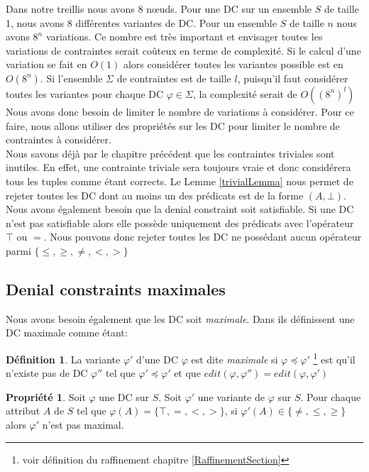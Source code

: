 \documentclass[letterpaper, 12pt]{report}
\theoremstyle{definition}
\newtheorem{mydef}{Définition}
\newtheorem{myprop}{Propriété}
\begin{document}
Dans notre treillis nous avons 8 nœuds. Pour une DC sur un ensemble $S$ de taille 1, nous avons 8 différentes variantes de DC. Pour un ensemble $S$ de taille $n$ nous avons $8^n$ variations. Ce nombre est très important et envisager toutes les variations de contraintes serait coûteux en terme de complexité. Si le calcul d'une variation se fait en $O(1)$ alors considérer toutes les variantes possible est en $O(8^n)$. Si l'ensemble $\Sigma$ de contraintes est de taille $l$, puisqu'il faut considérer toutes les variantes pour chaque DC $\varphi \in \Sigma$, la complexité serait de $O((8^n)^l)$ Nous avons donc besoin de limiter le nombre de variations à considérer. Pour ce faire, nous allons utiliser des propriétés sur les DC pour limiter le nombre de contraintes à considérer.\\

Nous savons déjà par le chapitre précédent que les contraintes triviales sont inutiles. En effet, une contrainte triviale sera toujours vraie et donc considérera tous les tuples comme étant corrects. Le Lemme \ref{trivialLemma} nous permet de rejeter toutes les DC dont au moins un des prédicats est de la forme $(A,\bot)$.\\

Nous avons également besoin que la denial constraint soit satisfiable. Si une DC n'est pas satisfiable alors elle possède uniquement des prédicats avec l'opérateur $\top$ ou $=$. Nous pouvons donc rejeter toutes les DC ne possédant aucun opérateur parmi $\{ \leq,\geq,\neq,<,> \}$\\

\subsection{Denial constraints maximales}

Nous avons besoin également que les DC soit \emph{maximale}. Dans \cite{main} ils définissent une DC maximale comme étant:

\begin{mydef}
 La variante $\varphi'$ d'une DC $\varphi$ est dite \emph{maximale} si  $\varphi \preceq \varphi'$ \footnote{voir définition du raffinement chapitre \ref{RaffinementSection}} est qu'il n'existe pas de DC $\varphi''$ tel que $\varphi' \preceq \varphi'$ et que $edit(\varphi,\varphi'') = edit(\varphi,\varphi')$
\end{mydef}

\begin{myprop}\cite{main}
\label{maxprop}
Soit $\varphi$ une DC sur $S$. Soit $\varphi'$ une variante de $\varphi$ sur $S$. Pour chaque attribut $A$ de $S$ tel que $\varphi(A) = \{ \top, =, <, > \}$, si $\varphi'(A) \in \{\neq,\leq,\geq \}$ alors $\varphi'$ n'est pas maximal.

\end{myprop}
\end{document}
